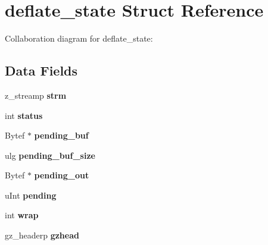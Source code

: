 \hypertarget{structdeflate__state}{\section{deflate\-\_\-state Struct Reference}
\label{d3/df8/structdeflate__state}
}


Collaboration diagram for deflate\-\_\-state\-:
\subsection*{Data Fields}
\begin{DoxyCompactItemize}
\item 
\hypertarget{structdeflate__state_a6bd9e93b9ae735c73a3bfb80d48f8ce3}{z\-\_\-streamp {\bfseries strm}}\label{d3/df8/structdeflate__state_a6bd9e93b9ae735c73a3bfb80d48f8ce3}

\item 
\hypertarget{structdeflate__state_a67c29e5e3ca8a35ef279ba4d2727b42b}{int {\bfseries status}}\label{d3/df8/structdeflate__state_a67c29e5e3ca8a35ef279ba4d2727b42b}

\item 
\hypertarget{structdeflate__state_a2cdf0871488bd1a43a53ae65af1e6913}{Bytef $\ast$ {\bfseries pending\-\_\-buf}}\label{d3/df8/structdeflate__state_a2cdf0871488bd1a43a53ae65af1e6913}

\item 
\hypertarget{structdeflate__state_ad291e0ef820fc6c5636966722e52b0a3}{ulg {\bfseries pending\-\_\-buf\-\_\-size}}\label{d3/df8/structdeflate__state_ad291e0ef820fc6c5636966722e52b0a3}

\item 
\hypertarget{structdeflate__state_a66d5d670125fb80b17f181f3d0348cd5}{Bytef $\ast$ {\bfseries pending\-\_\-out}}\label{d3/df8/structdeflate__state_a66d5d670125fb80b17f181f3d0348cd5}

\item 
\hypertarget{structdeflate__state_adb442c620531f4c293bb0752c772bab3}{u\-Int {\bfseries pending}}\label{d3/df8/structdeflate__state_adb442c620531f4c293bb0752c772bab3}

\item 
\hypertarget{structdeflate__state_ac08f462accdde479f090aebe58dec1fd}{int {\bfseries wrap}}\label{d3/df8/structdeflate__state_ac08f462accdde479f090aebe58dec1fd}

\item 
\hypertarget{structdeflate__state_af12619f9ba54190cff2625932d562bb1}{gz\-\_\-headerp {\bfseries gzhead}}\label{d3/df8/structdeflate__state_af12619f9ba54190cff2625932d562bb1}


\end{DoxyCompactItemize}
